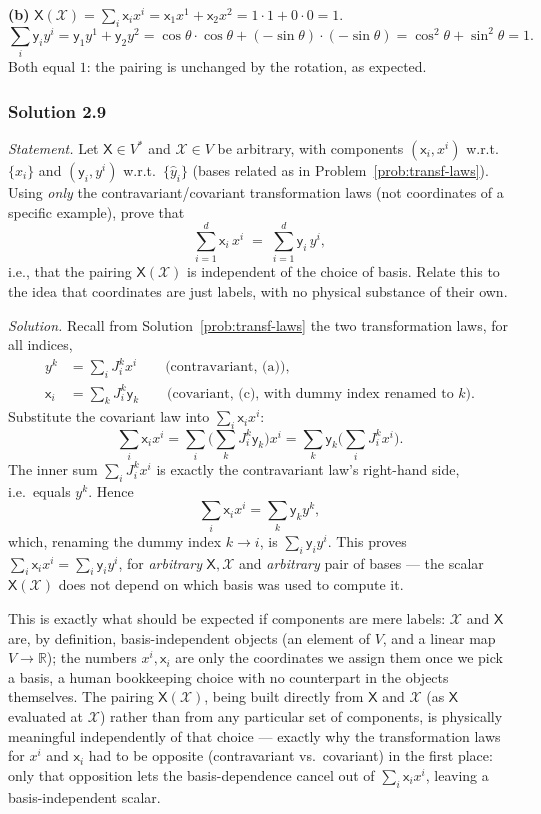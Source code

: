 \documentclass[11pt]{article}
\newcommand{\dual}{V^{*}}
\begin{document}
\textbf{(b)} $\mathsf X(\mathcal X)=\sum_i\mathsf x_ix^i=\mathsf x_1x^1+\mathsf x_2x^2=1\cdot1+0\cdot0=1$.
\[
\sum_i\mathsf y_iy^i=\mathsf y_1y^1+\mathsf y_2y^2=\cos\theta\cdot\cos\theta+(-\sin\theta)\cdot(-\sin\theta)=\cos^2\theta+\sin^2\theta=1.
\]
Both equal $1$: the pairing is unchanged by the rotation, as expected.

\subsubsection*{Solution 2.9}

\noindent\textit{Statement.}
Let $\mathsf{X} \in \dual$ and $\mathcal{X} \in V$ be arbitrary, with components $(\mathsf{x}_i, x^i)$ w.r.t.\ $\{\hat{x}_i\}$ and $(\mathsf{y}_i, y^i)$ w.r.t.\ $\{\hat{y}_i\}$ (bases related as in Problem~\ref{prob:transf-laws}). Using \emph{only} the contravariant/covariant transformation laws (not coordinates of a specific example), prove that
\[
\sum_{i=1}^d \mathsf{x}_i\, x^i \;=\; \sum_{i=1}^d \mathsf{y}_i\, y^i,
\]
i.e., that the pairing $\mathsf{X}(\mathcal{X})$ is independent of the choice of basis. Relate this to the idea that coordinates are just labels, with no physical substance of their own.

\medskip
\noindent\textit{Solution.} Recall from Solution~\ref{prob:transf-laws} the two transformation laws, for all indices,
\begin{align*}
y^k&=\sum_iJ_i^kx^i \qquad\text{(contravariant, (a))}, \\
\mathsf x_i&=\sum_kJ_i^k\mathsf y_k \qquad\text{(covariant, (c), with dummy index renamed to }k\text{)}.
\end{align*}
Substitute the covariant law into $\sum_i\mathsf x_ix^i$:
\[
\sum_i\mathsf x_ix^i=\sum_i\Big(\sum_kJ_i^k\mathsf y_k\Big)x^i=\sum_k\mathsf y_k\Big(\sum_iJ_i^kx^i\Big).
\]
The inner sum $\sum_iJ_i^kx^i$ is exactly the contravariant law's right-hand side, i.e.\ equals $y^k$. Hence
\[
\sum_i\mathsf x_ix^i=\sum_k\mathsf y_ky^k,
\]
which, renaming the dummy index $k\to i$, is $\sum_i\mathsf y_iy^i$. This proves $\sum_i\mathsf x_ix^i=\sum_i\mathsf y_iy^i$, for \emph{arbitrary} $\mathsf X,\mathcal X$ and \emph{arbitrary} pair of bases --- the scalar $\mathsf X(\mathcal X)$ does not depend on which basis was used to compute it.

This is exactly what should be expected if components are mere labels: $\mathcal X$ and $\mathsf X$ are, by definition, basis-independent objects (an element of $V$, and a linear map $V\to\mathbb R$); the numbers $x^i,\mathsf x_i$ are only the coordinates we assign them once we pick a basis, a human bookkeeping choice with no counterpart in the objects themselves. The pairing $\mathsf X(\mathcal X)$, being built directly from $\mathsf X$ and $\mathcal X$ (as $\mathsf X$ evaluated at $\mathcal X$) rather than from any particular set of components, is physically meaningful independently of that choice --- exactly why the transformation laws for $x^i$ and $\mathsf x_i$ had to be opposite (contravariant vs.\ covariant) in the first place: only that opposition lets the basis-dependence cancel out of $\sum_i\mathsf x_ix^i$, leaving a basis-independent scalar.
\end{document}

